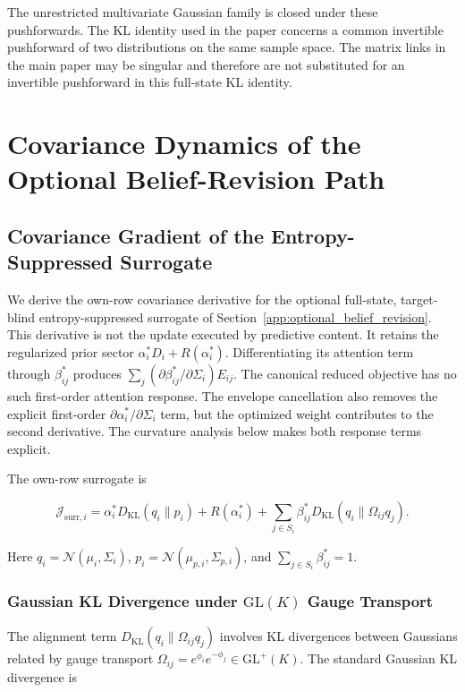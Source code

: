 \documentclass[twoside,11pt]{article}
\begin{document}
The unrestricted multivariate Gaussian family is closed under these pushforwards. The KL identity used in the paper concerns a common invertible pushforward of two distributions on the same sample space. The matrix links in the main paper may be singular and therefore are not substituted for an invertible pushforward in this full-state KL identity.
\section{Covariance Dynamics of the Optional Belief-Revision Path}
\label{app:covariance_dynamics}

\subsection{Covariance Gradient of the Entropy-Suppressed Surrogate}

We derive the own-row covariance derivative for the optional full-state, target-blind entropy-suppressed surrogate of Section~\ref{app:optional_belief_revision}. This derivative is not the update executed by predictive content. It retains the regularized prior sector $\alpha_i^*D_i+R(\alpha_i^*)$. Differentiating its attention term through $\beta_{ij}^*$ produces $\sum_j(\partial\beta_{ij}^*/\partial\Sigma_i)E_{ij}$. The canonical reduced objective has no such first-order attention response. The envelope cancellation also removes the explicit first-order $\partial\alpha_i^*/\partial\Sigma_i$ term, but the optimized weight contributes to the second derivative. The curvature analysis below makes both response terms explicit.

The own-row surrogate is

\begin{equation}
\mathcal{J}_{\mathrm{surr},i}
=\alpha_i^*D_{\mathrm{KL}}(q_i\|p_i)
+R(\alpha_i^*)
+\sum_{j\in S_i}\beta_{ij}^*D_{\mathrm{KL}}(q_i\|\Omega_{ij}q_j).
\end{equation}

Here $q_i=\mathcal{N}(\mu_i,\Sigma_i)$, $p_i=\mathcal{N}(\mu_{p,i},\Sigma_{p,i})$, and $\sum_{j\in S_i}\beta_{ij}^*=1$.

\subsubsection{Gaussian KL Divergence under $\mathrm{GL}(K)$ Gauge Transport}

The alignment term $D_{\mathrm{KL}}(q_i \| \Omega_{ij} q_j)$ involves KL divergences between Gaussians related by gauge transport $\Omega_{ij} = e^{\phi_i}e^{-\phi_j} \in \mathrm{GL}^+(K)$. The standard Gaussian KL divergence \citep{Bishop2006,murphy2012machine,CoverThomas2006} is
\end{document}
